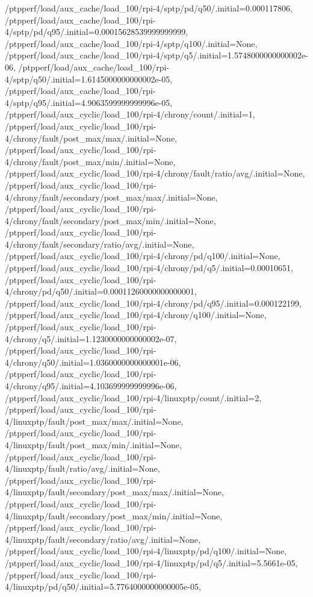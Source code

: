 {    /ptpperf/load/aux_cache/load_100/rpi-4/sptp/pd/q50/.initial=0.000117806,
    /ptpperf/load/aux_cache/load_100/rpi-4/sptp/pd/q95/.initial=0.00015628539999999999,
    /ptpperf/load/aux_cache/load_100/rpi-4/sptp/q100/.initial=None,
    /ptpperf/load/aux_cache/load_100/rpi-4/sptp/q5/.initial=1.5748000000000002e-06,
    /ptpperf/load/aux_cache/load_100/rpi-4/sptp/q50/.initial=1.6145000000000002e-05,
    /ptpperf/load/aux_cache/load_100/rpi-4/sptp/q95/.initial=4.9063599999999996e-05,
    /ptpperf/load/aux_cyclic/load_100/rpi-4/chrony/count/.initial=1,
    /ptpperf/load/aux_cyclic/load_100/rpi-4/chrony/fault/post_max/max/.initial=None,
    /ptpperf/load/aux_cyclic/load_100/rpi-4/chrony/fault/post_max/min/.initial=None,
    /ptpperf/load/aux_cyclic/load_100/rpi-4/chrony/fault/ratio/avg/.initial=None,
    /ptpperf/load/aux_cyclic/load_100/rpi-4/chrony/fault/secondary/post_max/max/.initial=None,
    /ptpperf/load/aux_cyclic/load_100/rpi-4/chrony/fault/secondary/post_max/min/.initial=None,
    /ptpperf/load/aux_cyclic/load_100/rpi-4/chrony/fault/secondary/ratio/avg/.initial=None,
    /ptpperf/load/aux_cyclic/load_100/rpi-4/chrony/pd/q100/.initial=None,
    /ptpperf/load/aux_cyclic/load_100/rpi-4/chrony/pd/q5/.initial=0.00010651,
    /ptpperf/load/aux_cyclic/load_100/rpi-4/chrony/pd/q50/.initial=0.00011260000000000001,
    /ptpperf/load/aux_cyclic/load_100/rpi-4/chrony/pd/q95/.initial=0.000122199,
    /ptpperf/load/aux_cyclic/load_100/rpi-4/chrony/q100/.initial=None,
    /ptpperf/load/aux_cyclic/load_100/rpi-4/chrony/q5/.initial=1.1230000000000002e-07,
    /ptpperf/load/aux_cyclic/load_100/rpi-4/chrony/q50/.initial=1.0360000000000001e-06,
    /ptpperf/load/aux_cyclic/load_100/rpi-4/chrony/q95/.initial=4.103699999999996e-06,
    /ptpperf/load/aux_cyclic/load_100/rpi-4/linuxptp/count/.initial=2,
    /ptpperf/load/aux_cyclic/load_100/rpi-4/linuxptp/fault/post_max/max/.initial=None,
    /ptpperf/load/aux_cyclic/load_100/rpi-4/linuxptp/fault/post_max/min/.initial=None,
    /ptpperf/load/aux_cyclic/load_100/rpi-4/linuxptp/fault/ratio/avg/.initial=None,
    /ptpperf/load/aux_cyclic/load_100/rpi-4/linuxptp/fault/secondary/post_max/max/.initial=None,
    /ptpperf/load/aux_cyclic/load_100/rpi-4/linuxptp/fault/secondary/post_max/min/.initial=None,
    /ptpperf/load/aux_cyclic/load_100/rpi-4/linuxptp/fault/secondary/ratio/avg/.initial=None,
    /ptpperf/load/aux_cyclic/load_100/rpi-4/linuxptp/pd/q100/.initial=None,
    /ptpperf/load/aux_cyclic/load_100/rpi-4/linuxptp/pd/q5/.initial=5.5661e-05,
    /ptpperf/load/aux_cyclic/load_100/rpi-4/linuxptp/pd/q50/.initial=5.7764000000000005e-05,
}
